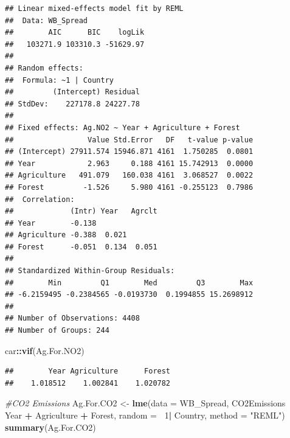 \documentclass[12pt,]{article}
\newenvironment{Shaded}{\begin{snugshade}}{\end{snugshade}}
\newcommand{\KeywordTok}[1]{\textcolor[rgb]{0.13,0.29,0.53}{\textbf{#1}}}
\newcommand{\DataTypeTok}[1]{\textcolor[rgb]{0.13,0.29,0.53}{#1}}
\newcommand{\DecValTok}[1]{\textcolor[rgb]{0.00,0.00,0.81}{#1}}
\newcommand{\StringTok}[1]{\textcolor[rgb]{0.31,0.60,0.02}{#1}}
\newcommand{\CommentTok}[1]{\textcolor[rgb]{0.56,0.35,0.01}{\textit{#1}}}
\newcommand{\OperatorTok}[1]{\textcolor[rgb]{0.81,0.36,0.00}{\textbf{#1}}}
\newcommand{\NormalTok}[1]{#1}
\begin{document}
\begin{verbatim}
## Linear mixed-effects model fit by REML
##  Data: WB_Spread 
##        AIC      BIC    logLik
##   103271.9 103310.3 -51629.97
## 
## Random effects:
##  Formula: ~1 | Country
##         (Intercept) Residual
## StdDev:    227178.8 24227.78
## 
## Fixed effects: Ag.NO2 ~ Year + Agriculture + Forest 
##                 Value Std.Error   DF   t-value p-value
## (Intercept) 27911.574 15946.871 4161  1.750285  0.0801
## Year            2.963     0.188 4161 15.742913  0.0000
## Agriculture   491.079   160.038 4161  3.068527  0.0022
## Forest         -1.526     5.980 4161 -0.255123  0.7986
##  Correlation: 
##             (Intr) Year   Agrclt
## Year        -0.138              
## Agriculture -0.388  0.021       
## Forest      -0.051  0.134  0.051
## 
## Standardized Within-Group Residuals:
##        Min         Q1        Med         Q3        Max 
## -6.2159495 -0.2384565 -0.0193730  0.1994855 15.2698912 
## 
## Number of Observations: 4408
## Number of Groups: 244
\end{verbatim}

\begin{Shaded}
\begin{Highlighting}[]
\NormalTok{car}\OperatorTok{::}\KeywordTok{vif}\NormalTok{(Ag.For.NO2)}
\end{Highlighting}
\end{Shaded}

\begin{verbatim}
##        Year Agriculture      Forest 
##    1.018512    1.002841    1.020782
\end{verbatim}

\begin{Shaded}
\begin{Highlighting}[]
\CommentTok{#CO2 Emissions}
\NormalTok{Ag.For.CO2 <-}\StringTok{ }\KeywordTok{lme}\NormalTok{(}\DataTypeTok{data =}\NormalTok{ WB_Spread,}
\NormalTok{                 CO2Emissions }\OperatorTok{~}\StringTok{ }\NormalTok{Year }\OperatorTok{+}\StringTok{ }\NormalTok{Agriculture }\OperatorTok{+}\StringTok{ }\NormalTok{Forest,}
                 \DataTypeTok{random =} \OperatorTok{~}\DecValTok{1}\OperatorTok{|}\StringTok{ }\NormalTok{Country,}
                 \DataTypeTok{method =} \StringTok{"REML"}\NormalTok{)}
\KeywordTok{summary}\NormalTok{(Ag.For.CO2)}
\end{Highlighting}
\end{Shaded}
\end{document}
